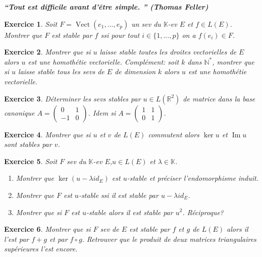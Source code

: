 \documentclass[12pt,a4paper]{article}
\newcommand{\R}{\mathbb{R}}
\newcommand{\N}{\mathbb{N}}
\newcommand{\K}{\mathbb{K} }
\DeclareMathOperator{\Ima }{Im}
\DeclareMathOperator{\vect}{Vect}
\theoremstyle{break}
\theoremstyle{break}
\newtheorem{Exo}{Exercice}
\begin{document}
\emph{\textbf{“Tout est difficile avant d'être simple.
		” (Thomas Feller)}}
%

\begin{Exo}
	Soit $F=\vect(e_1,...,e_p)$ un sev du $\K$-ev $E$ et $f\in L(E)$. Montrer que $F$ est stable par $f$ ssi pour tout $i\in\{1,...,p\}$ on a $f(e_i)\in F$.
\end{Exo}

\begin{Exo}
	Montrer que si $u$ laisse stable toutes les droites vectorielles de $E$ alors $u$ est une homothétie vectorielle. Complément: soit $k$ dans $\N^*$, montrer que si $u$ laisse stable tous les sevs de $E$ de dimension $k$ alors $u$ est une homothétie vectorielle.
\end{Exo}

\begin{Exo}
Déterminer les sevs stables par $u\in L(\R^2)$ de matrice dans la base canonique $A=\begin{pmatrix}
0 & 1 \\
-1 & 0
\end{pmatrix}$. Idem si $A=\begin{pmatrix}
1 & 1 \\
0 & 1
\end{pmatrix}$.
\end{Exo}

\begin{Exo}
	Montrer que si $u$ et $v$ de $L(E)$ commutent alors $\ker u$ et $\Ima u$ sont stables par $v$.
\end{Exo}

\begin{Exo}
	Soit $F$ sev du $\K$-ev $E$,$u\in L(E)$ et $\lambda \in \K$.
	\begin{enumerate}
		\item
		Montrer que $\ker(u-\lambda id_E)$ est $u$-stable et préciser l'endomorphisme induit.
		\item
		Montrer que $F$ est $u$-stable ssi il est stable par $u-\lambda id_E$.
		\item
		Montrer que si $F$ est $u$-stable alors il est stable par $u^2$. Réciproque?
	\end{enumerate}
\end{Exo}

\begin{Exo}
	Montrer que si $F$ sev de $E$ est stable par $f$ et $g$ de $L(E)$ alors il l'est   par $f+g$ et par $f\circ g$. Retrouver que le produit de deux matrices triangulaires supérieures l'est encore.
\end{Exo}
\end{document}
